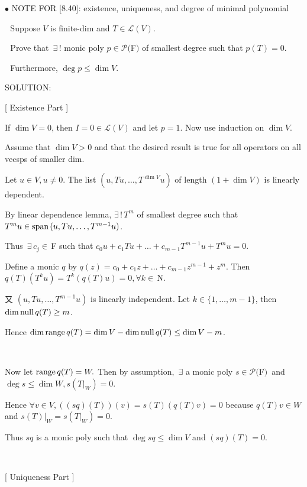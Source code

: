 \documentclass[a4paper, 11pt, UTF8]{article}
\def\range{\textup{range}\,}
\def\null{\textup{null\,}}
\def\Spn{\textup{span}\,}
\def\Lm{\mathcal{L}}
\def\Po{\mathcal{P}}
\def\Fbf{$\,{\timesbf F}\,$}
\def\Nbfc{$\,{\timesbf N}$}
\begin{document}
\begin{large}
{\small $\bullet$} {\timesbf\Large N{\normalsize OTE} F{\normalsize OR} [8.40]:} {\timessl\normalsize existence, uniqueness, and degree of minimal polynomial}\par\,\,
{\timessl\Large Suppose $V$ is finite-dim and $T \in \Lm(V)$.}\par\,\,
{\timessl\Large Prove that $\,\exists\,!$ monic poly $p \in \Po(${\timesbf F}$)$ of smallest degree such that $p(T) = 0$.}\par\,\,
{\timessl\Large Furthermore, $\deg p\leq \dim V$.}\par
{\timesbf S\footnotesize{OLUTION:}}\par\quad
{\LARGE[} {\timessl\Large Existence Part} {\LARGE]}\par\quad
If $\dim V = 0$, then $I=0\in\Lm(V)$ and let $p=1$. Now use induction on $\dim V$.\par\quad
{\timessl Assume that $\dim V > 0$ and that the desired result is true for all operators on all vecsps of smaller dim.}\par\quad
Let $u\in V,u\neq 0$. The list $(u, Tu, \dots, T^{\dim V} u)$ of length $(1 + \dim V)$ is linearly dependent.\par\quad
By linear dependence lemma, $\exists\,!\,T^{m}$ of smallest degree such that $T^m u\in\Spn(u, Tu, \dots, T^{m-1} u)$.\par\quad
Thus $\,\exists\,c_j\in\Fbf\,$such that $c_0 u + c_1 Tu +\dots + c_{m-1} T^{m-1} u + T^m u = 0$.\par\quad
Define a monic $q$ by
$q(z) = c_0 + c_1 z + \dots + c_{m-1} z^{m-1} + z^m$. Then $q(T)(T^k u)=T^k(q(T)u)=0, \forall k\in\Nbfc.$\par\quad
又 $(u, Tu, \dots , T^{m-1} u)$ is linearly independent. Let $k\in\{1,\dots,m-1\}$, then $\dim\null q(T) \geq m$.\par\quad
Hence $\dim \range q(T) = \dim V - \dim \null q(T) \leq \dim V - m$.\par{\tiny\,\par}\quad
Now let $\range q(T)=W.$ Then by {\timessl assumption}, $\,\exists$ a monic poly $s\in\Po(${\timesbf F}$)$ \,{\small and}\, $\deg s\leq\dim W,s(T|_W ) = 0$.\par\quad
Hence $\forall v\in V,((sq)(T))(v) = s(T)(q(T)v) = 0$ because $q(T)v\in W$ and $s(T)|_W = s(T|_W ) = 0$.\par\quad
Thus $sq$ is a monic poly such that $\deg sq\leq \dim V$ and $(sq)(T) = 0$.\par{\tiny\,\par}\quad
{\LARGE[} {\timessl\Large Uniqueness Part} {\LARGE]}\par\quad

\end{large}
\end{document}
